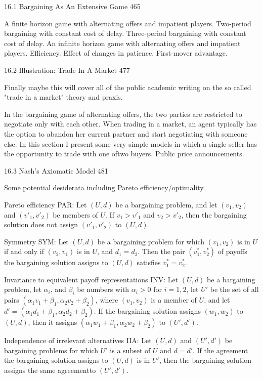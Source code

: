 16.1 Bargaining As An Extensive Game 465

A finite horizon game with alternating offers and impatient players. Two-period bargaining with constant cost of delay. Three-period bargaining with constant cost of delay. An infinite horizon game with alternating offers and impatient players. Efficiency. Effect of changes in patience. First-mover advantage.

16.2 Illustration: Trade In A Market 477

Finally maybe this will cover all of the public academic writing on the so called "trade in a market" theory and praxis.

In the bargaining game of alternating offers, the two parties are restricted to negotiate only with each other. When trading in a market, an agent typically has the option to abandon her current partner and start negotiating with someone else. In this section I present some very simple models in which a single seller has the opportunity to trade with one oftwo buyers. Public price announcements.

16.3 Nash's Axiomatic Model 481

Some potential desiderata including Pareto efficiency/optimality.

Pareto efficiency PAR: Let $(U,d)$ be a bargaining problem, and let $(v_1,v_2)$ and $(v'_1,v'_2)$ be members of $U$. If $v_1>v'_1$ and $v_2>v'_2$, then the bargaining solution does not assign $(v'_1,v'_2)$ to $(U,d)$.

Symmetry SYM: Let $(U,d)$ be a bargaining problem for which $(v_1,v_2)$ is in $U$ if and only if $(v_2,v_1)$ is in $U$, and $d_1=d_2$. Then the pair $(v^{*}_1,v^{*}_2)$ of payoffs the bargaining solution assigns to $(U,d)$ satisfies $v^{*}_1=v^{*}_2$.

Invariance to equivalent payoff representations INV: Let $(U,d)$ be a bargaining problem, let $\alpha_i$, and $\beta_i$ be numbers with $\alpha_i>0$ for $i=1,2$, let $U'$ be the set of all pairs $(\alpha_1 v_1+\beta_1,\alpha_2 v_2 + \beta_2)$, where $(v_1,v_2)$ is a member of $U$, and let $d'=(\alpha_1 d_1+\beta_1,\alpha_2 d_2+\beta_2)$. If the bargaining solution assigns $(w_1,w_2)$ to $(U,d)$, then it assigns $(\alpha_1 w_1+\beta_1,\alpha_2 w_2+\beta_2)$ to $(U',d')$.

Independence of irrelevant alternatives IIA: Let $(U,d)$ and $(U',d')$ be bargaining problems for which $U'$ is a subset of $U$ and $d=d'$. If the agreement the bargaining solution assigns to $(U,d)$ is in $U'$, then the bargaining solution assigns the same agreementto $(U',d')$.

